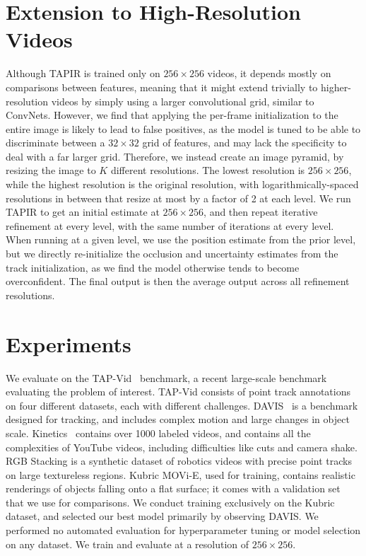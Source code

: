 \documentclass[10pt,twocolumn,letterpaper]{article}
\begin{document}
\section{Extension to High-Resolution Videos}
Although TAPIR is trained only on $256 \times 256$ videos, it depends mostly on comparisons between features, meaning that it might extend trivially to higher-resolution videos by simply using a larger convolutional grid, similar to ConvNets.  However, we find that applying the per-frame initialization to the entire image is likely to lead to false positives, as the model is tuned to be able to discriminate between a $32\times 32$ grid of features, and may lack the specificity to deal with a far larger grid.  Therefore, we instead create an image pyramid, by resizing the image to $K$ different resolutions.  The lowest resolution is $256 \times 256$, while the highest resolution is the original resolution, with logarithmically-spaced resolutions in between that resize at most by a factor of 2 at each level.  We run TAPIR to get an initial estimate at $256\times 256$, and then repeat iterative refinement at every level, with the same number of iterations at every level.  When running at a given level, we use the position estimate from the prior level, but we directly re-initialize the occlusion and uncertainty estimates from the track initialization, as we find the model otherwise tends to become overconfident.  The final output is then the average output across all refinement resolutions.


\section{Experiments}

We evaluate on the TAP-Vid~\cite{doersch2022tap} benchmark, a recent large-scale benchmark evaluating the problem of interest.  TAP-Vid consists of point track annotations on four different datasets, each with different challenges.  DAVIS~\cite{pont20172017} is a benchmark designed for tracking, and includes complex motion and large changes in object scale. Kinetics~\cite{carreira2017quo} contains over 1000 labeled videos, and contains all the complexities of YouTube videos, including difficulties like cuts and camera shake.  RGB Stacking is a synthetic dataset of robotics videos with precise point tracks on large textureless regions.  Kubric MOVi-E, used for training, contains realistic renderings of objects falling onto a flat surface; it comes with a validation set that we use for comparisons. We conduct training exclusively on the Kubric dataset, and selected our best model primarily by observing DAVIS.  We performed no automated evaluation for hyperparameter tuning or model selection on any dataset.  We train and evaluate at a resolution of $256\times 256$. 
\end{document}

